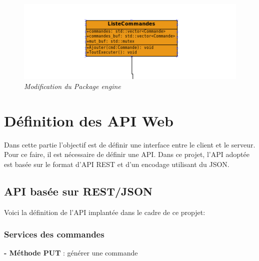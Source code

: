 \documentclass[11pt, a4paper]{article}
\begin{document}
\begin{figure}[H]
  \centering
  \includegraphics[scale=0.45]{img/engine_mod.png}
  \caption{\emph{Modification du Package engine}}
\end{figure}

\section{Définition des API Web}
Dans cette partie l'objectif est de définir une interface entre le client et le serveur. Pour ce faire, il est nécessaire de définir une API.
Dans ce projet, l'API adoptée est basée sur le format d'API REST et d'un encodage utilisant du JSON.
  \subsection{API basée sur REST/JSON}
  Voici la définition de l'API implantée dans le cadre de ce propjet:\\
  \subsubsection{Services des commandes}
  \textbf{- Méthode PUT } : générer une commande
  
\end{document}
